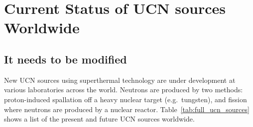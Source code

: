 













\section{Current Status of UCN sources Worldwide}
\subsection {It needs to be modified}
New UCN sources using superthermal technology are under development at
various laboratories across the world.  Neutrons are produced by two
methods: proton-induced spallation off a heavy nuclear target
(e.g.~tungsten), and fission where neutrons are produced by a nuclear
reactor. Table~\ref{tab:full_ucn_sources}~\cite{Jeff_dnp} shows a
list of the present and future UCN sources worldwide.


